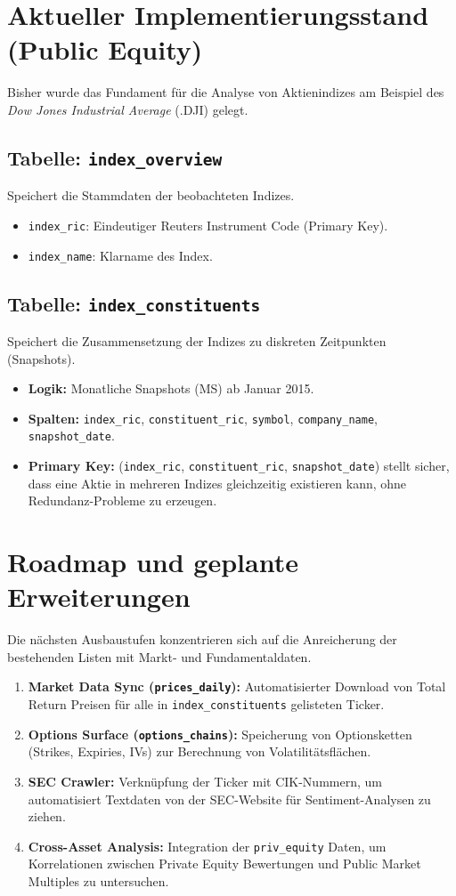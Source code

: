 \documentclass[12pt,a4paper]{article}
\begin{document}
\section{Aktueller Implementierungsstand (Public Equity)}
Bisher wurde das Fundament für die Analyse von Aktienindizes am Beispiel des \textit{Dow Jones Industrial Average} (.DJI) gelegt.

\subsection{Tabelle: \texttt{index\_overview}}
Speichert die Stammdaten der beobachteten Indizes.
\begin{itemize}
    \item \texttt{index\_ric}: Eindeutiger Reuters Instrument Code (Primary Key).
    \item \texttt{index\_name}: Klarname des Index.
\end{itemize}

\subsection{Tabelle: \texttt{index\_constituents}}
Speichert die Zusammensetzung der Indizes zu diskreten Zeitpunkten (Snapshots).
\begin{itemize}
    \item \textbf{Logik:} Monatliche Snapshots (MS) ab Januar 2015.
    \item \textbf{Spalten:} \texttt{index\_ric}, \texttt{constituent\_ric}, \texttt{symbol}, \texttt{company\_name}, \texttt{snapshot\_date}.
    \item \textbf{Primary Key:} (\texttt{index\_ric}, \texttt{constituent\_ric}, \texttt{snapshot\_date}) stellt sicher, dass eine Aktie in mehreren Indizes gleichzeitig existieren kann, ohne Redundanz-Probleme zu erzeugen.
\end{itemize}

\section{Roadmap und geplante Erweiterungen}
Die nächsten Ausbaustufen konzentrieren sich auf die Anreicherung der bestehenden Listen mit Markt- und Fundamentaldaten.

\begin{enumerate}
    \item \textbf{Market Data Sync (\texttt{prices\_daily}):} Automatisierter Download von Total Return Preisen für alle in \texttt{index\_constituents} gelisteten Ticker.
    \item \textbf{Options Surface (\texttt{options\_chains}):} Speicherung von Optionsketten (Strikes, Expiries, IVs) zur Berechnung von Volatilitätsflächen.
    \item \textbf{SEC Crawler:} Verknüpfung der Ticker mit CIK-Nummern, um automatisiert Textdaten von der SEC-Website für Sentiment-Analysen zu ziehen.
    \item \textbf{Cross-Asset Analysis:} Integration der \texttt{priv\_equity} Daten, um Korrelationen zwischen Private Equity Bewertungen und Public Market Multiples zu untersuchen.
\end{enumerate}
\end{document}
